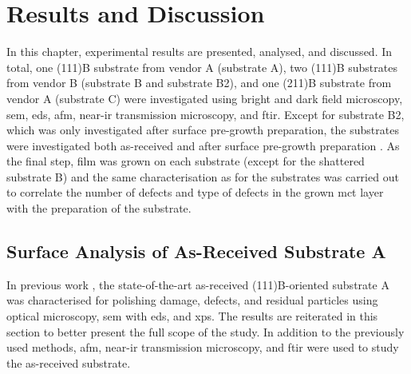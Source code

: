 \chapter{Results and Discussion}\label{ch:results-and-discussion}
In this chapter, experimental results are presented, analysed, and discussed. In total, one (111)B substrate from vendor A (substrate A), two (111)B substrates from vendor B (substrate B and substrate B2), and one (211)B substrate from vendor A (substrate C) were investigated using bright and dark field microscopy, \ac{sem}, \ac{eds}, \ac{afm}, near-\ac{ir} transmission microscopy, and \ac{ftir}. Except for substrate B2, which was only investigated after surface pre-growth preparation, the substrates were investigated both as-received and after surface pre-growth preparation . As the final step,  film was grown on each substrate (except for the shattered substrate B) and the same characterisation as for the substrates was carried out to correlate the number of defects and  type of defects in the grown \ac{mct} layer with the preparation of the substrate.
\section{Surface Analysis of As-Received Substrate A}\label{sec:subAa}
In previous work \citep{lauten2017characterisation}, the state-of-the-art as-received (111)B-oriented substrate A was characterised for polishing damage, defects, and residual particles using optical microscopy, \ac{sem} with \ac{eds}, and \ac{xps}. The results are reiterated in this section to better present the full scope of the study. In addition to the previously used methods, \ac{afm}, near-\ac{ir} transmission microscopy, and \ac{ftir} were used to study the as-received substrate.

